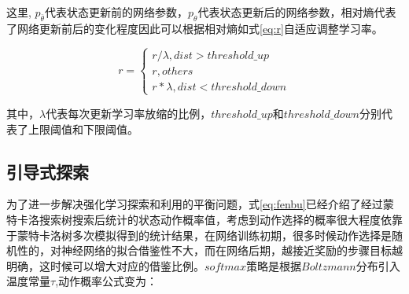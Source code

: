 这里, $p_{\bar \theta}$代表状态更新前的网络参数，$p_\theta $代表状态更新后的网络参数，相对熵代表了网络更新前后的变化程度因此可以根据相对熵如式\ref{eq:r}自适应调整学习率。

\begin{equation}
\label{eq:r}
r = \left\{ {\begin{array}{*{20}{c}}
	{r/\lambda ,dist > threshold\_up}\\
	{r,others}\\
	{r*\lambda ,dist < threshold\_down}
	\end{array}} \right.
\end{equation}

其中，$\lambda$代表每次更新学习率放缩的比例，$threshold\_up$和$threshold\_down$分别代表了上限阈值和下限阈值。

\subsection{引导式探索}

为了进一步解决强化学习探索和利用的平衡问题，式\ref{eq:fenbu}已经介绍了经过蒙特卡洛搜索树搜索后统计的状态动作概率值，考虑到动作选择的概率很大程度依靠于蒙特卡洛树多次模拟得到的统计结果，在网络训练初期，很多时候动作选择是随机性的，对神经网络的拟合借鉴性不大，而在网络后期，越接近奖励的步骤目标越明确，这时候可以增大对应的借鉴比例。$softmax$策略是根据$Boltzmann$分布引入温度常量$\tau $,动作概率公式变为：

